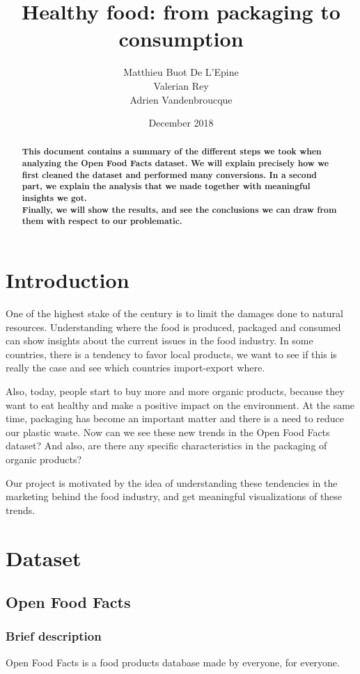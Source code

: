 \documentclass[11pt]{article}
\title{Healthy food: from packaging to consumption}
\date{December 2018}
\author{Matthieu Buot De L'Epine  \\\And
  Valerian Rey  \\\And
Adrien Vandenbroucque \\}
\begin{document}
\maketitle
\begin{abstract}
  \textbf{This document contains a summary of the different steps we took when analyzing the Open Food Facts dataset. We will explain precisely how we first cleaned the dataset and performed many conversions. In a second part, we explain the analysis that we made together with meaningful insights we got.\\
  Finally, we will show the results, and see the conclusions we can draw from them with respect to our problematic.}
\end{abstract}

\section{Introduction}
One of the highest stake of the century is to limit the damages done to natural resources. Understanding where the food is produced, packaged and consumed can show insights about the current issues in the food industry. In some countries, there is a tendency to favor local products, we want to see if this is really the case and see which countries import-export where.

Also, today, people start to buy more and more organic products, because they want to eat healthy and make a positive impact on the environment. At the same time, packaging has become an important matter and there is a need to reduce our plastic waste. Now can we see these new trends in the Open Food Facts dataset? And also, are there any specific characteristics in the packaging of organic products?

Our project is motivated by the idea of understanding these tendencies in the marketing behind the food industry, and get meaningful visualizations of these trends.

\section{Dataset}

\subsection{Open Food Facts}
\subsubsection{Brief description}
Open Food Facts is a food products database made by everyone, for everyone.
\end{document}
